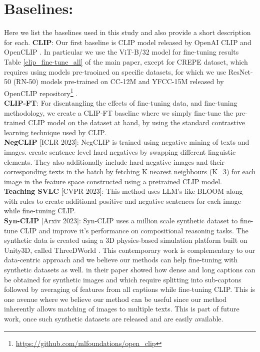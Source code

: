 \documentclass[11pt]{article}
\begin{document}
\begin{table}[h!]
\section{Baselines:}
\label{baselines}
Here we list the baselines used in this study and also provide a short description for each.
\noindent \textbf{CLIP}\citep{radford2021learning}: Our first baseline is CLIP model released by OpenAI CLIP\citep{radford2021learning} and OpenCLIP \citep{Ilharco_OpenCLIP_2021}. In particular we use the ViT-B/32 model for fine-tuning results Table \ref{clip_fine-tune_all} of the main paper, except for CREPE dataset, which requires using models pre-traoined on specific datasets, for which we use ResNet-50 (RN-50) models pre-trained on CC-12M and YFCC-15M released by OpenCLIP repository\footnote{\url{https://github.com/mlfoundations/open_clip}} \citep{Ilharco_OpenCLIP_2021}.\\
\noindent \textbf{CLIP-FT}: For disentangling the effects of fine-tuning data, and fine-tuning methodology, we create a CLIP-FT baseline where we simply fine-tune the pre-trained CLIP model on the dataset at hand, by using the standard contrastive learning technique used by CLIP. \\
\noindent \textbf{NegCLIP}\citep{yuksekgonul2022and} [ICLR 2023]: NegCLIP is trained using negative mining of texts and images. \citet{yuksekgonul2022and} create sentence level hard negatives by swapping different linguistic elements. They also additionally include hard-negative images and their corresponding texts in the batch by fetching K nearest neighbours (K=3) for each image in the feature space constructed using a pretrained CLIP model.\\
\noindent \textbf{Teaching SVLC}\citep{doveh2023teaching} [CVPR 2023]: This method uses LLM's like BLOOM \citep{bloom} along with rules to create additional positive and negative sentences for each image while fine-tuning CLIP.\\
\noindent \textbf{Syn-CLIP}\citep{cascantebonilla2023going} [Arxiv 2023]: Syn-CLIP uses a million scale synthetic dataset to fine-tune CLIP and improve it's performance on compositional reasoning tasks. The synthetic data is created using a 3D physics-based simulation platform built on Unity3D, called ThreeDWorld \citep{gan2021threedworld}. This contemporary work is complementary to our data-centric approach and we believe our methods can help fine-tuning with synthetic datasets as well. \citet{cascantebonilla2023going} in their paper showed how dense and long captions can be obtained for synthetic images and which require splitting into sub-captons followed by averaging of features from all captions while fine-tuning CLIP. This is one avenue where we believe our method can be useful since our method inherently allows matching of images to multiple texts. This is part of future work, once such synthetic datasets are released and are easily available. \\


\end{table}
\end{document}
